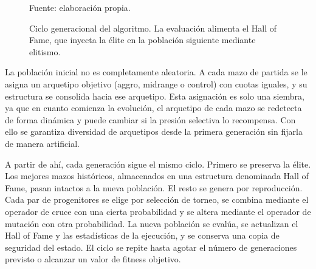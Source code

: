 \begin{figure}[H]
\centering
{}
\caption{Ciclo generacional del algoritmo. La evaluación alimenta el Hall of Fame, que inyecta la élite en la población siguiente mediante elitismo.}
\label{fig:bucle}
\vspace{2pt}
{\footnotesize Fuente: elaboración propia.}
\end{figure}

La población inicial no es completamente aleatoria. A cada mazo de partida se le asigna un arquetipo objetivo (aggro, midrange o control) con cuotas iguales, y su estructura se consolida hacia ese arquetipo. Esta asignación es solo una siembra, ya que en cuanto comienza la evolución, el arquetipo de cada mazo se redetecta de forma dinámica y puede cambiar si la presión selectiva lo recompensa. Con ello se garantiza diversidad de arquetipos desde la primera generación sin fijarla de manera artificial.

A partir de ahí, cada generación sigue el mismo ciclo. Primero se preserva la élite. Los mejores mazos históricos, almacenados en una estructura denominada Hall of Fame, pasan intactos a la nueva población. El resto se genera por reproducción. Cada par de progenitores se elige por selección de torneo, se combina mediante el operador de cruce con una cierta probabilidad y se altera mediante el operador de mutación con otra probabilidad. La nueva población se evalúa, se actualizan el Hall of Fame y las estadísticas de la ejecución, y se conserva una copia de seguridad del estado. El ciclo se repite hasta agotar el número de generaciones previsto o alcanzar un valor de fitness objetivo.

